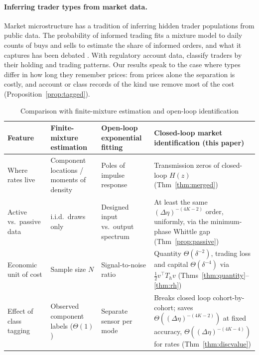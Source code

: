 \documentclass[12pt]{article}
\theoremstyle{definition}
\theoremstyle{remark}
\begin{document}
\paragraph{Inferring trader types from market data.} Market microstructure has a tradition of inferring hidden trader populations from public data. The probability of informed trading \citep{easley1996} fits a mixture model to daily counts of buys and sells to estimate the share of informed orders, and what it captures has been debated \citep{duarte2009}. With regulatory account data, \citet{kirilenko2017} classify traders by their holding and trading patterns. Our results speak to the case where types differ in how long they remember prices: from prices alone the separation is costly, and account or class records of the kind \citet{kirilenko2017} use remove most of the cost (Proposition~\ref{prop:tagged}).

\begin{table}[t]\centering\small
\begin{threeparttable}
\caption{Comparison with finite-mixture estimation and open-loop identification}\label{tab:novelty}
\setlength{\tabcolsep}{4pt}
\begin{tabular}{*{4}{>{\raggedright\arraybackslash}p{}}}
\toprule
Feature & Finite-mixture estimation \citep{heinrich2018,wu2020} & Open-loop exponential fitting \citep{roy1989,batenkov2021} & Closed-loop market identification (this paper)\\
\midrule
Where rates live & Component locations / moments of density & Poles of impulse response & Transmission zeros of closed-loop $H(z)$ (Thm~\ref{thm:merged})\\
Active vs.\ passive data & i.i.d.\ draws only & Designed input vs.\ output spectrum & At least the same $(\Delta\eta)^{-(4K-2)}$ order, uniformly, via the minimum-phase Whittle gap (Thm~\ref{prop:passive})\\
Economic unit of cost & Sample size $N$ & Signal-to-noise ratio & Quantity $\Theta(\delta^{-2})$, trading loss and capital $\Theta(\delta^{-4})$ via $\tfrac12v^\top T_hv$ (Thms~\ref{thm:quantity}--\ref{thm:rh})\\
Effect of class tagging & Observed component labels ($\Theta(1)$) & Separate sensor per mode & Breaks closed loop cohort-by-cohort; saves $\Theta((\Delta\eta)^{-(4K-2)})$ at fixed accuracy, $\Theta((\Delta\eta)^{-(4K-4)})$ for rates (Thm~\ref{thm:discvalue})\\
\bottomrule
\end{tabular}
\end{threeparttable}
\end{table}
\end{document}
